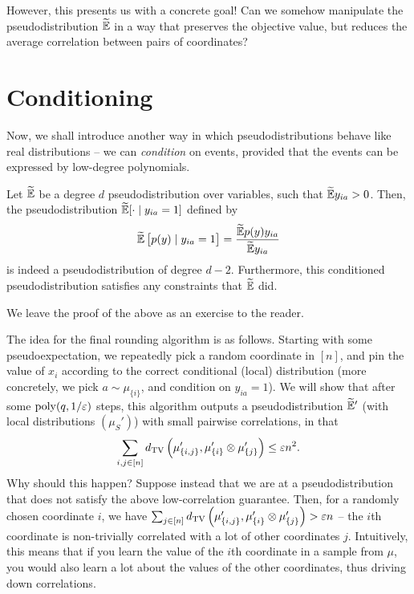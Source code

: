 \documentclass{article}
\begin{document}
However, this presents us with a concrete goal! Can we somehow manipulate the pseudodistribution $\widetilde{\mathbb{E}}$ in a way that preserves the objective value, but reduces the average correlation between pairs of coordinates?

\section{Conditioning}

Now, we shall introduce another way in which pseudodistributions behave like real distributions -- we can \emph{condition} on events, provided that the events can be expressed by low-degree polynomials.

\begin{lemma}
	Let $\widetilde{\mathbb{E}}$ be a degree $d$ pseudodistribution over variables, such that $\widetilde{\mathbb{E}} y_{ia} > 0$. Then, the pseudodistribution $\widetilde{\mathbb{E}}[ \cdot \mid y_{ia} = 1 ]$ defined by
	\[ \widetilde{\mathbb{E}} \left[ p(y) \mid y_{ia} = 1 \right] = \frac{\widetilde{\mathbb{E}} p(y) y_{ia}}{\widetilde{\mathbb{E}} y_{ia}} \]
	is indeed a pseudodistribution of degree $d-2$. Furthermore, this conditioned pseudodistribution satisfies any constraints that $\widetilde{\mathbb{E}}$ did.
\end{lemma}

We leave the proof of the above as an exercise to the reader.

The idea for the final rounding algorithm is as follows. Starting with some pseudoexpectation, we repeatedly pick a random coordinate in $[n]$, and pin the value of $x_i$ according to the correct conditional (local) distribution (more concretely, we pick $a \sim \mu_{\{i\}}$, and condition on $y_{ia} = 1$). We will show that after some $\operatorname{poly}(q,1/\varepsilon)$ steps, this algorithm outputs a pseudodistribution $\widetilde{\mathbb{E}}'$ (with local distributions $(\mu_S')$) with small pairwise correlations, in that
\begin{equation}
	\label{eq:low-global-corr}
	\sum_{i,j \in [n]} d_{\mathrm{TV}}\left( \mu'_{\{i,j\}} , \mu'_{\{i\}} \otimes \mu'_{\{j\}} \right) \le \varepsilon n^2.
\end{equation}
Why should this happen? Suppose instead that we are at a pseudodistribution that does not satisfy the above low-correlation guarantee. Then, for a randomly chosen coordinate $i$, we have $ \sum_{j \in [n]} d_{\mathrm{TV}}\left( \mu'_{\{i,j\}} , \mu'_{\{i\}} \otimes \mu'_{\{j\}} \right) > \varepsilon n$ -- the $i$th coordinate is non-trivially correlated with a lot of other coordinates $j$. Intuitively, this means that if you learn the value of the $i$th coordinate in a sample from $\mu$, you would also learn a lot about the values of the other coordinates, thus driving down correlations.
\end{document}
